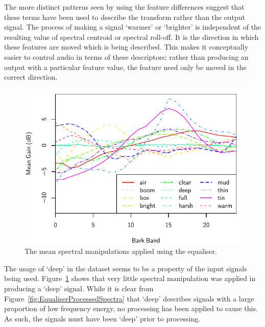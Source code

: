 			The more distinct patterns seen by using the feature differences suggest that these terms have been
			used to describe the transform rather than the output signal. The process of making a signal
			`warmer' or `brighter' is independent of the resulting value of spectral centroid or spectral
			roll-off. It is the direction in which these features are moved which is being described. This
			makes it conceptually easier to control audio in terms of these descriptors; rather than producing
			an output with a particular feature value, the feature need only be moved in the correct direction.

			\begin{figure}[h!]
				\centering
				\includegraphics{chapter4/Images/EqualiserDifferenceSpectra.pdf}
				\caption{The mean spectral manipulations applied using the equaliser.}
				\label{fig:EqualiserDifferenceSpectra}
			\end{figure}

			The usage of `deep' in the dataset seems to be a property of the input signals being used.
			Figure~\ref{fig:EqualiserDifferenceSpectra} shows that very little spectral manipulation was
			applied in producing a `deep' signal. While it is clear from
			Figure~\ref{fig:EqualiserProcessedSpectra} that `deep' describes signals with a large proportion of
			low frequency energy, no processing has been applied to cause this. As such, the signals must have
			been `deep' prior to processing.

